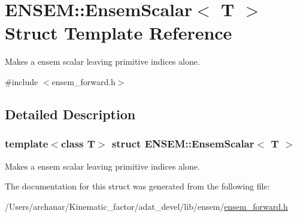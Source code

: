 \hypertarget{structENSEM_1_1EnsemScalar}{}\section{E\+N\+S\+EM\+:\+:Ensem\+Scalar$<$ T $>$ Struct Template Reference}
\label{structENSEM_1_1EnsemScalar}


Makes a ensem scalar leaving primitive indices alone.  




{\ttfamily \#include $<$ensem\+\_\+forward.\+h$>$}



\subsection{Detailed Description}
\subsubsection*{template$<$class T$>$\newline
struct E\+N\+S\+E\+M\+::\+Ensem\+Scalar$<$ T $>$}

Makes a ensem scalar leaving primitive indices alone. 

The documentation for this struct was generated from the following file\+:\begin{DoxyCompactItemize}
\item 
/\+Users/archanar/\+Kinematic\+\_\+factor/adat\+\_\+devel/lib/ensem/\mbox{\hyperlink{lib_2ensem_2ensem__forward_8h}{ensem\+\_\+forward.\+h}}\end{DoxyCompactItemize}
